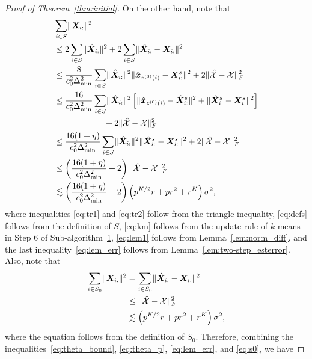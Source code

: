 \documentclass[journal]{IEEEtran}
\theoremstyle{definition}
\theoremstyle{definition}
\newcommand{\of}[1]{\left(#1\right)}
\newcommand{\off}[1]{\left[#1\right]}
\begin{document}
\begin{proof}[Proof of Theorem~\ref{thm:initial}]
    On the other hand, note that 
    \begin{align}
         &\sum_{i \in S} \onormSize{}{\mX_{i:}}^2\\
         & \leq 2 \sum_{i \in S} \onormSize{}{\hat \mX_{i:}}^2  +  2\sum_{i \in S} \onormSize{}{\hat \mX_{i:} - \mX_{i:}}^2 \label{eq:tr1}\\
         & \leq \frac{8}{c_0^2 \Delta_{\min}^2  } \sum_{i \in S} \onormSize{}{\hat \mX_{i:}}^2   \onormSize{}{\hat \mx_{z^{(0)}(i)} - \mX_{i:}^s }^2 
          +2 \onormSize{}{\hat \tX - \tX}_F^2 \label{eq:defs} \\
         & \leq \frac{16}{c_0^2 \Delta_{\min}^2  }\sum_{i \in S} \onormSize{}{\hat \mX_{i:}}^2  \off{ \onormSize{}{\hat \mx_{z^{(0)}(i)} - \hat \mX_{i:}^s }^2 + \onormSize{}{\hat \mX_{i:}^s - \mX_{i:}^s }^2 } \\
         & \quad \quad \quad \quad \quad \quad + 2\onormSize{}{\hat \tX - \tX}_F^2 \label{eq:tr2} \\
         & \leq  \frac{16(1 + \eta)}{c_0^2 \Delta_{\min}^2 }\sum_{i \in S} \onormSize{}{\hat \mX_{i:}}^2  \onormSize{}{\hat \mX_{i:}^s - \mX_{i:}^s }^2  + 2\onormSize{}{\hat \tX - \tX}_F^2 \label{eq:km} \\
         & \leq \of{ \frac{16(1 + \eta)}{c_0^2 \Delta_{\min}^2 } + 2 }\onormSize{}{\hat \tX - \tX}_F^2 \label{eq:lem1}\\
         & \lesssim \of{ \frac{16(1 + \eta)}{c_0^2 \Delta_{\min}^2 } + 2 } \of{ p^{K/2}r + pr^2 + r^K } \sigma^2 \label{eq:lem_err},
    \end{align}
    where inequalities \eqref{eq:tr1} and \eqref{eq:tr2} follow from the triangle inequality, \eqref{eq:defs} follows from the definition of $S$, \eqref{eq:km} follows from the update rule of $k$-means in Step 6 of Sub-algorithm~\hyperref[alg:main]{1}, \eqref{eq:lem1} follows from Lemma~\ref{lem:norm_diff}, and the last inequality~\eqref{eq:lem_err} follows from Lemma~\ref{lem:two-step_esterror}. Also, note that 
    \begin{align}
        \sum_{i \in S_0} \onormSize{}{\mX_{i:}}^2 &=  \sum_{i \in S_0} \onormSize{}{\hat \mX_{i:}- \mX_{i:}}^2 \\
        &\leq \onormSize{}{\hat \tX - \tX}_F^2 \\
        &\lesssim \of{ p^{K/2}r + pr^2 + r^K } \sigma^2,\label{eq:s0}
    \end{align}
    where the equation follows from the definition of $S_0$. Therefore, combining the inequalities~\eqref{eq:theta_bound}, \eqref{eq:theta_p}, \eqref{eq:lem_err}, and \eqref{eq:s0}, we have 

\end{proof}
\end{document}
